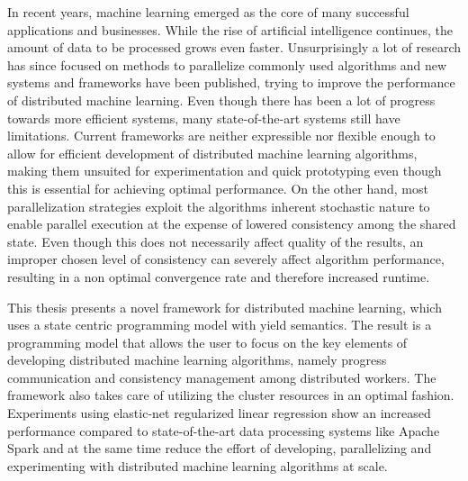 % 
% 
%
In recent years, machine learning emerged as the core of many successful applications and businesses.
While the rise of artificial intelligence continues, the amount of data to be processed grows even faster.
Unsurprisingly a lot of research has since focused on methods to parallelize commonly used algorithms and new systems and frameworks have been published, trying to improve the performance of distributed machine learning.
Even though there has been a lot of progress towards more efficient systems, many state-of-the-art systems still have limitations.
Current frameworks are neither expressible nor flexible enough to allow for efficient development of distributed machine learning algorithms, making them unsuited for experimentation and quick prototyping even though this is essential for achieving optimal performance.
On the other hand, most parallelization strategies exploit the algorithms inherent stochastic nature to enable parallel execution at the expense of lowered consistency among the shared state.
Even though this does not necessarily affect quality of the results, an improper chosen level of consistency can severely affect algorithm performance, resulting in a non optimal convergence rate and therefore increased runtime.

This thesis presents a novel framework for distributed machine learning, which uses a state centric programming model with yield semantics.
The result is a programming model that allows the user to focus on the key elements of developing distributed machine learning algorithms, namely progress communication and consistency management among distributed workers.
The framework also takes care of utilizing the cluster resources in an optimal fashion.
Experiments using elastic-net regularized linear regression show an increased performance compared to state-of-the-art data processing systems like Apache Spark and at the same time reduce the effort of developing, parallelizing and experimenting with distributed machine learning algorithms at scale.
